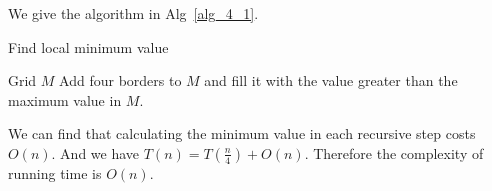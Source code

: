 We give the algorithm in Alg~\ref{alg_4_1}.
\begin{algorithm}[!htbp]
\caption{Find local minimum value}
\label{alg_4_1}
\begin{algorithmic}[1]
\REQUIRE Grid $M$
\STATE Add four borders to $M$ and fill it with the value greater than the maximum value in $M$.
    \ELSE
    \ENDIF
\ENDWHILE
\end{algorithmic}
\end{algorithm}
We can find that calculating the minimum value in each recursive step costs $O(n)$. And we have $T(n)=T(\frac{n}{4})+O(n)$. Therefore the complexity of running time is $O(n)$. 